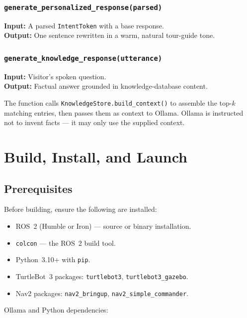 \documentclass[12pt,a4paper]{report}
\begin{document}
\subsection{\texttt{generate\_personalized\_response(parsed)}}

\textbf{Input:} A parsed \texttt{IntentToken} with a base response.\\
\textbf{Output:} One sentence rewritten in a warm, natural tour-guide tone.

\subsection{\texttt{generate\_knowledge\_response(utterance)}}

\textbf{Input:} Visitor's spoken question.\\
\textbf{Output:} Factual answer grounded in knowledge-database content.

The function calls \texttt{KnowledgeStore.build\_context()} to assemble the
top-$k$ matching entries, then passes them as context to Ollama.
Ollama is instructed not to invent facts — it may only use the supplied context.

\chapter{Build, Install, and Launch}
\label{ch:build}

\section{Prerequisites}

Before building, ensure the following are installed:

\begin{itemize}[leftmargin=2em]
  \item ROS~2 (Humble or Iron) — source or binary installation.
  \item \texttt{colcon} — the ROS~2 build tool.
  \item Python~3.10+ with \texttt{pip}.
  \item TurtleBot~3 packages: \texttt{turtlebot3}, \texttt{turtlebot3\_gazebo}.
  \item Nav2 packages: \texttt{nav2\_bringup}, \texttt{nav2\_simple\_commander}.
\end{itemize}

Ollama and Python dependencies:
\end{document}
